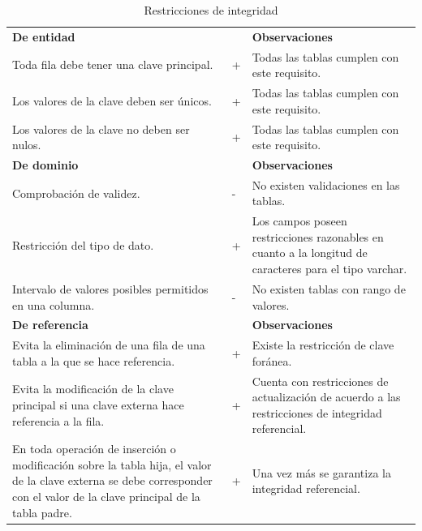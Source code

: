 \documentclass[10pt,times,twocolumn]{article}
\begin{document}
\begin{table}[H]
    \centering
    \begin{tabular}{p{3cm}p{0.3cm}p{3.7cm}}
        \rowcolor{gray!15}
        \textbf{De entidad} &  & \textbf{Observaciones} \\
        Toda fila debe tener una clave principal. & + & Todas las tablas cumplen con este requisito. \\
       	Los valores de la clave deben ser únicos. & + & Todas las tablas cumplen con este requisito. \\
       	Los valores de la clave no deben ser nulos. & + & Todas las tablas cumplen con este requisito. \\
       	\textbf{De dominio} &  & \textbf{Observaciones} \\
       	Comprobación de validez. & - & No existen validaciones en las tablas. \\
       	Restricción del tipo de dato. & + & Los campos poseen restricciones razonables en cuanto a la longitud de caracteres para el tipo varchar. \\
       	Intervalo de valores posibles permitidos en una columna. & - & No existen tablas con rango de valores. \\
       	\textbf{De referencia} &  & \textbf{Observaciones} \\
       	Evita la eliminación de una  fila de una tabla a la que se hace referencia. & + & Existe la restricción de clave foránea. \\
       	Evita la modificación de la clave principal si una clave externa hace referencia a la fila. & + & Cuenta con restricciones de actualización de acuerdo a las restricciones de integridad referencial. \\
       	En toda operación de inserción o modificación sobre la tabla hija, el valor de la clave externa se debe corresponder con el valor de la clave principal de la tabla padre. & + & Una vez más se garantiza la integridad referencial. \\
       	
    \end{tabular}
    \caption{Restricciones de integridad}
    \label{tab:restricciones_integridad}
\end{table}
\end{document}
